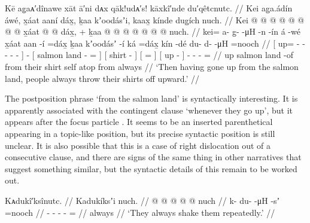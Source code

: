 \ex\label{ex:89-25-threw-off-shirts}%
%
\begingl
	\glpreamble	Kē ag̣aᴀ′dînawe xāt ā′ni dᴀx qāk!udᴀ′s! kāxkî′nde du′qêtcnutc. //
	\glpreamble	Kei ag̱a.ádín áwé, x̱áat aaní dáx̱, ḵaa kʼoodásʼi, kaax̱ kínde dug̱ích nuch. //
	\gla	{} Kei @  @ {} @ {} @ {} @ {} @ {} @ {} {}
		 @ {}
		{} x̱áat  @ {} @ \•dáx̱, {} +
		{} ḵaa  @ {} {}
		{} {}  @ {} {}
		{}  @ {} {}
		 @ {} @ {} @ {} @ \•nuch. //
	\glb	{} kei= a- {} g̱-  -μH -n -ín {}
		á -wé
		{} x̱áat aan -í =dáx̱ {}
		{} ḵaa kʼoodásʼ -í {} 
		{} {} ká =dáx̱ {}
		{} kín -dé {}
		du- d-  -μH =nooch //
	\glc	{}[ up= - \· -  - - - {}]
		 -
		{}[ salmon land - = {}]
		{}[  shirt - {}]
		{}[   = {}]
		{}[ up - {}]
		- -  - = //
	\gld	{} up  {} {} {} {} {} {} {}
		 {}
		{} salmon land -of \•from {}
		{} their shirt {} {}
		{} self atop \•from {}
		{}  {} {}
		 {} {} {} \•always //
	\glft	‘Then having gone up from the salmon land, people always throw their shirts off upward.’
		//
\endgl
\xe

The postposition phrase  ‘from the salmon land’ is syntactically interesting.
It is apparently associated with the contingent clause  ‘whenever they go up’, but it appears after the focus particle .
It seems to be an inserted parenthetical appearing in a topic-like position, but its precise syntactic position is still unclear.
It is also possible that this is a case of right dislocation out of a consecutive clause, and there are signs of the same thing in other narratives that suggest something similar, but the syntactic details of this remain to be worked out.

\ex\label{ex:89-26-shake-them}%
%
\begingl
	\glpreamble	Kᴀdukî′ksînutc. //
	\glpreamble	Kadukíksʼi nuch. //
	\gla	{} @ {} @ {} @ {} @ {} @ \•nuch //
	\glb	k- du-  -μH -sʼ =nooch //
	\glc	{}- -  - - = //
	\gld	{} {} {} {} {} \•always //
	\glft	‘They always shake them repeatedly.’
		//
\endgl
\xe

